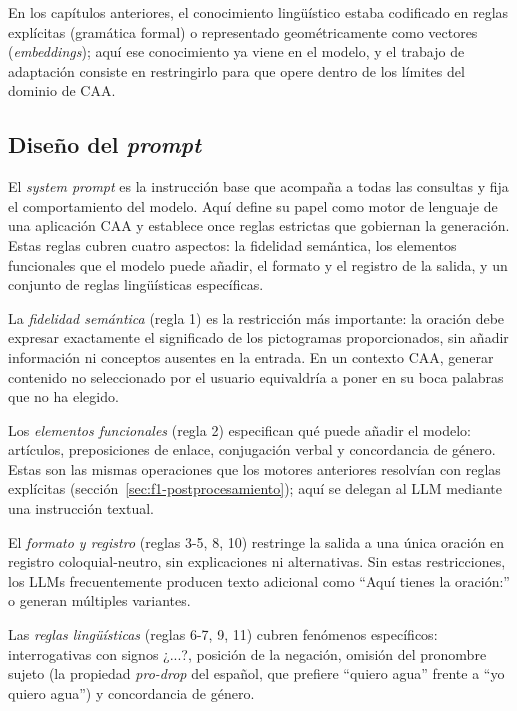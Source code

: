 En los capítulos anteriores, el conocimiento lingüístico estaba codificado en reglas explícitas (gramática formal) o representado geométricamente como vectores (\textit{embeddings}); aquí ese conocimiento ya viene en el modelo, y el trabajo de adaptación consiste en restringirlo para que opere dentro de los límites del dominio de CAA.

\subsection{Diseño del \textit{prompt}}
\label{sec:f3-prompt}


El \textit{system prompt} es la instrucción base que acompaña a todas las consultas y fija el comportamiento del modelo. Aquí define su papel como motor de lenguaje de una aplicación CAA y establece once reglas estrictas que gobiernan la generación. Estas reglas cubren cuatro aspectos: la fidelidad semántica, los elementos funcionales que el modelo puede añadir, el formato y el registro de la salida, y un conjunto de reglas lingüísticas específicas.

La \textit{fidelidad semántica} (regla 1) es la restricción más importante: la oración debe expresar exactamente el significado de los pictogramas proporcionados, sin añadir información ni conceptos ausentes en la entrada. En un contexto CAA, generar contenido no seleccionado por el usuario equivaldría a poner en su boca palabras que no ha elegido.

Los \textit{elementos funcionales} (regla 2) especifican qué puede añadir el modelo: artículos, preposiciones de enlace, conjugación verbal y concordancia de género. Estas son las mismas operaciones que los motores anteriores resolvían con reglas explícitas (sección~\ref{sec:f1-postprocesamiento}); aquí se delegan al LLM mediante una instrucción textual.

El \textit{formato y registro} (reglas 3-5, 8, 10) restringe la salida a una única oración en registro coloquial-neutro, sin explicaciones ni alternativas. Sin estas restricciones, los LLMs frecuentemente producen texto adicional como ``Aquí tienes la oración:'' o generan múltiples variantes.

Las \textit{reglas lingüísticas} (reglas 6-7, 9, 11) cubren fenómenos específicos: interrogativas con signos ¿...?, posición de la negación, omisión del pronombre sujeto (la propiedad \textit{pro-drop} del español, que prefiere ``quiero agua'' frente a ``yo quiero agua'') y concordancia de género.



